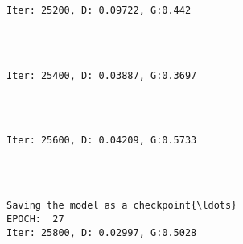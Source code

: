 \documentclass[11pt]{article}
\begin{document}
    \begin{Verbatim}[commandchars=\\\{\}]

Iter: 25200, D: 0.09722, G:0.442
    \end{Verbatim}

    \begin{center}
    \end{center}
    { \hspace*{\fill} \\}
    
    \begin{Verbatim}[commandchars=\\\{\}]

Iter: 25400, D: 0.03887, G:0.3697
    \end{Verbatim}

    \begin{center}
    \end{center}
    { \hspace*{\fill} \\}
    
    \begin{Verbatim}[commandchars=\\\{\}]

Iter: 25600, D: 0.04209, G:0.5733
    \end{Verbatim}

    \begin{center}
    \end{center}
    { \hspace*{\fill} \\}
    
    \begin{Verbatim}[commandchars=\\\{\}]

Saving the model as a checkpoint{\ldots}
EPOCH:  27
Iter: 25800, D: 0.02997, G:0.5028
    \end{Verbatim}

    \begin{center}
    \end{center}
    { \hspace*{\fill} \\}
    
\end{document}
